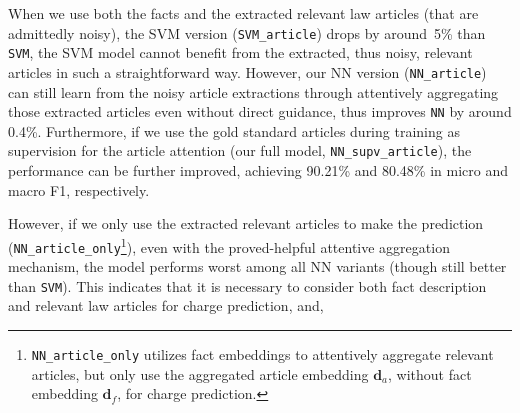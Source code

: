 
When we use both the facts and the extracted relevant law articles (that are admittedly noisy),
the SVM version (\texttt{SVM\_article}) drops by around~5\% than \texttt{SVM},  the SVM model 
cannot benefit from the extracted, thus noisy, relevant articles in such a straightforward way.
However, our NN version (\texttt{NN\_article}) can still learn from  the noisy article extractions through 
attentively aggregating those extracted articles even without direct guidance,
thus improves \texttt{NN} by around 0.4\%.
Furthermore, if we use the gold standard articles during training as supervision for the 
article attention (our full model, \texttt{NN\_supv\_article}), the performance can be further improved, achieving 
90.21\% and 80.48\% in micro and macro F1, respectively.

However, if we only use the extracted relevant articles to make the prediction (\texttt{NN\_article\_only}\footnote{
\texttt{NN\_article\_only} utilizes fact embeddings to attentively aggregate relevant articles, but only use 
the aggregated article embedding $\mathbf{d}_a$, without fact embedding  $\mathbf{d}_f$,  for charge prediction.}),
even with the proved-helpful attentive aggregation mechanism, the model performs worst among all NN 
variants (though still better than \texttt{SVM}). This  indicates that  it is necessary to consider both fact description and 
relevant law articles for charge prediction, and,



